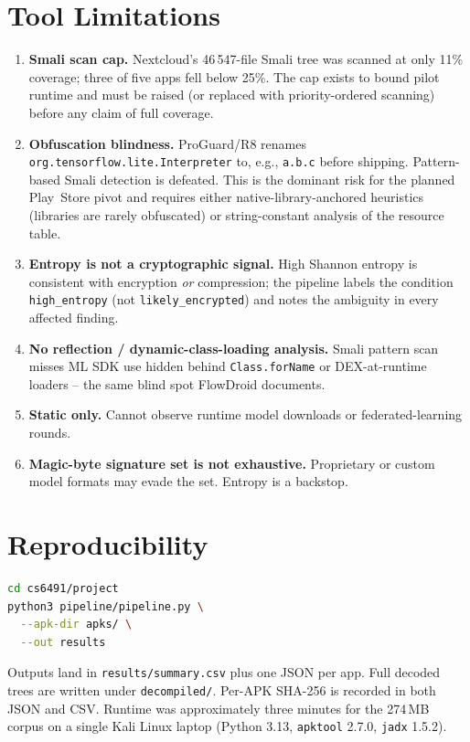 \documentclass[conference]{IEEEtran}
\begin{document}
\section{Tool Limitations}
\label{sec:limitations}

\begin{enumerate}
\item \textbf{Smali scan cap.} Nextcloud's 46\,547-file Smali tree was
  scanned at only 11\% coverage; three of five apps fell below 25\%.
  The cap exists to bound pilot runtime and must be raised (or
  replaced with priority-ordered scanning) before any claim of full
  coverage.
\item \textbf{Obfuscation blindness.} ProGuard/R8 renames
  \texttt{org.tensorflow.lite.Interpreter} to, e.g., \texttt{a.b.c}
  before shipping. Pattern-based Smali detection is defeated. This is
  the dominant risk for the planned Play~Store pivot and requires
  either native-library-anchored heuristics (libraries are rarely
  obfuscated) or string-constant analysis of the resource table.
\item \textbf{Entropy is not a cryptographic signal.} High Shannon
  entropy is consistent with encryption \emph{or} compression; the
  pipeline labels the condition \texttt{high\_entropy} (not
  \texttt{likely\_encrypted}) and notes the ambiguity in every
  affected finding.
\item \textbf{No reflection / dynamic-class-loading analysis.} Smali
  pattern scan misses ML SDK use hidden behind \texttt{Class.forName}
  or DEX-at-runtime loaders -- the same blind spot FlowDroid
  documents.
\item \textbf{Static only.} Cannot observe runtime model downloads or
  federated-learning rounds.
\item \textbf{Magic-byte signature set is not exhaustive.} Proprietary
  or custom model formats may evade the set. Entropy is a backstop.
\end{enumerate}

\section{Reproducibility}

\begin{lstlisting}[language=bash]
cd cs6491/project
python3 pipeline/pipeline.py \
  --apk-dir apks/ \
  --out results
\end{lstlisting}

Outputs land in \texttt{results/summary.csv} plus one JSON per app.
Full decoded trees are written under \texttt{decompiled/}. Per-APK
SHA-256 is recorded in both JSON and CSV. Runtime was approximately
three minutes for the 274\,MB corpus on a single Kali Linux laptop
(Python 3.13, \texttt{apktool} 2.7.0, \texttt{jadx} 1.5.2).
\end{document}
